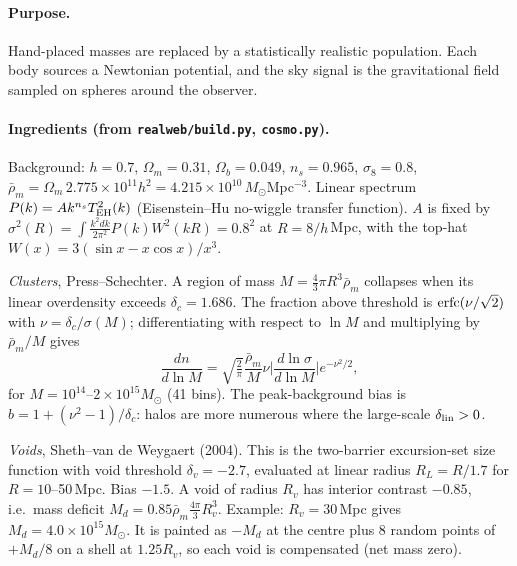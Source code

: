 \documentclass[10pt,twocolumn]{article}
\begin{document}
\paragraph{Purpose.} Hand-placed masses are replaced by a statistically realistic population. Each body sources a Newtonian potential, and the sky signal is the gravitational field sampled on spheres around the observer.

\paragraph{Ingredients (from \texttt{realweb/build.py}, \texttt{cosmo.py}).} Background: $h=0.7$, $\Omega_m=0.31$, $\Omega_b=0.049$, $n_s=0.965$, $\sigma_8=0.8$, $\bar\rho_m=\Omega_m\,2.775\times10^{11}h^2=4.215\times10^{10}\,M_\odot$Mpc$^{-3}$. Linear spectrum $P(k)=Ak^{n_s}T_{\rm EH}^2(k)$ (Eisenstein--Hu no-wiggle transfer function). $A$ is fixed by $\sigma^2(R)=\int\frac{k^2dk}{2\pi^2}P(k)W^2(kR)=0.8^2$ at $R=8/h$\,Mpc, with the top-hat $W(x)=3(\sin x-x\cos x)/x^3$.

\emph{Clusters}, Press--Schechter. A region of mass $M=\tfrac43\pi R^3\bar\rho_m$ collapses when its linear overdensity exceeds $\delta_c=1.686$. The fraction above threshold is ${\rm erfc}(\nu/\sqrt2)$ with $\nu=\delta_c/\sigma(M)$; differentiating with respect to $\ln M$ and multiplying by $\bar\rho_m/M$ gives
\begin{equation}
\frac{dn}{d\ln M}=\sqrt{\tfrac2\pi}\frac{\bar\rho_m}{M}\nu\Big|\frac{d\ln\sigma}{d\ln M}\Big|e^{-\nu^2/2},
\end{equation}
for $M=10^{14}$--$2\times10^{15}M_\odot$ (41 bins). The peak-background bias is $b=1+(\nu^2-1)/\delta_c$: halos are more numerous where the large-scale $\delta_{\rm lin}>0$.

\emph{Voids}, Sheth--van de Weygaert (2004). This is the two-barrier excursion-set size function with void threshold $\delta_v=-2.7$, evaluated at linear radius $R_L=R/1.7$ for $R=10$--50\,Mpc. Bias $-1.5$. A void of radius $R_v$ has interior contrast $-0.85$, i.e.\ mass deficit $M_d=0.85\bar\rho_m\tfrac{4\pi}{3}R_v^3$. Example: $R_v=30$\,Mpc gives $M_d=4.0\times10^{15}M_\odot$. It is painted as $-M_d$ at the centre plus 8 random points of $+M_d/8$ on a shell at $1.25R_v$, so each void is compensated (net mass zero).
\end{document}
